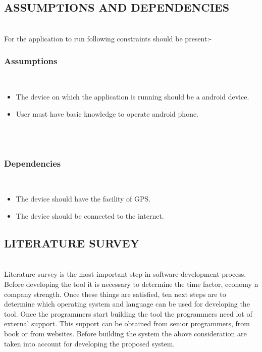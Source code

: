 \documentclass[12pt,a4paper]{article}
\begin{document}
\newpage
\pagestyle{plain} 
\begin{center}
\subsection{ASSUMPTIONS AND DEPENDENCIES}
\end{center}
\\
\hspace{0.7 cm} For the application to run following constraints should be present:-
\subsubsection{Assumptions}
\\
\begin{itemize}
\item The device on which the application is running should be a android device.
\item User must have basic knowledge to operate android phone.
\end{itemize}
\\
\\
\subsubsection{Dependencies}
\\
\begin{itemize}
\item The device should have the facility of GPS.
\item The device should be connected to the internet.
\end{itemize}


\newpage
\pagestyle{plain} 
\begin{center}
\subsection{LITERATURE SURVEY}
\end{center}
\\ 
\hspace{0.7 cm}Literature survey is the most important step in software development process. Before developing the tool it is necessary to determine the time factor, economy n company strength. Once these things are satisfied, ten next steps are to determine which operating system and language can be used for developing the tool. Once the programmers start building the tool the programmers need lot of external support. This support can be obtained from senior programmers, from book or from websites. Before building the system the above consideration are taken into account for developing the proposed system.
\\
\end{document}
